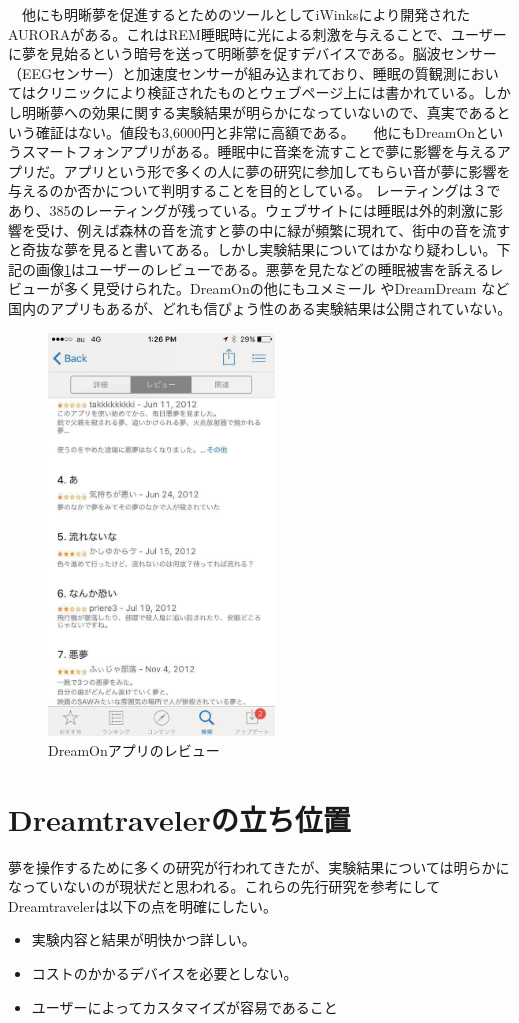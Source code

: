 　他にも明晰夢を促進するとためのツールとしてiWinksにより開発されたAURORAがある。\cite{iWinks}これはREM睡眠時に光による刺激を与えることで、ユーザーに夢を見始るという暗号を送って明晰夢を促すデバイスである。脳波センサー（EEGセンサー）と加速度センサーが組み込まれており、睡眠の質観測においてはクリニックにより検証されたものとウェブページ上には書かれている。しかし明晰夢への効果に関する実験結果が明らかになっていないので、真実であるという確証はない。値段も3,6000円と非常に高額である。
　他にもDreamOnというスマートフォンアプリがある。睡眠中に音楽を流すことで夢に影響を与えるアプリだ。アプリという形で多くの人に夢の研究に参加してもらい音が夢に影響を与えるのか否かについて判明することを目的としている。 \cite{dreamOn}レーティングは３であり、385のレーティングが残っている。ウェブサイトには睡眠は外的刺激に影響を受け、例えば森林の音を流すと夢の中に緑が頻繁に現れて、街中の音を流すと奇抜な夢を見ると書いてある。しかし実験結果についてはかなり疑わしい。下記の画像\ref{DreamOnImage}はユーザーのレビューである。悪夢を見たなどの睡眠被害を訴えるレビューが多く見受けられた。DreamOnの他にもユメミール \cite{yumemiru}やDreamDream \cite{DreamDream}など国内のアプリもあるが、どれも信ぴょう性のある実験結果は公開されていない。

\begin{figure}[htbp]
\begin{center}
\includegraphics[width=6cm]{eps/dreamOn.eps}
\caption{DreamOnアプリのレビュー}
\label{DreamOnImage}
\end{center}
\end{figure}

\section{Dreamtravelerの立ち位置}
夢を操作するために多くの研究が行われてきたが、実験結果については明らかになっていないのが現状だと思われる。これらの先行研究を参考にしてDreamtravelerは以下の点を明確にしたい。
\begin{itemize}

\item 実験内容と結果が明快かつ詳しい。
\item コストのかかるデバイスを必要としない。
\item ユーザーによってカスタマイズが容易であること

\end{itemize}